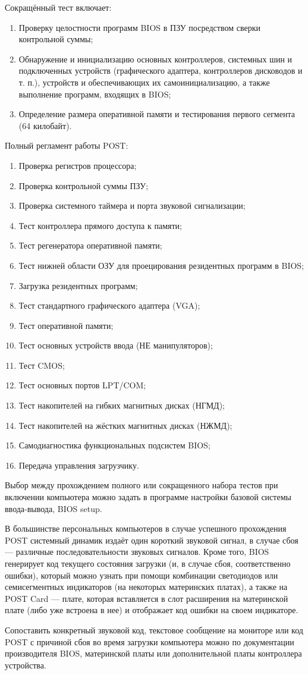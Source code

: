Сокращённый тест включает:
\begin{enumerate}
 \item Проверку целостности программ BIOS в ПЗУ посредством сверки контрольной суммы;
 \item Обнаружение и инициализацию основных контроллеров, системных шин и подключенных устройств (графического адаптера, контроллеров дисководов и т. п.), устройств и обеспечивающих их самоинициализацию, а также выполнение программ, входящих в BIOS;
 \item Определение размера оперативной памяти и тестирования первого сегмента (64 килобайт).
\end{enumerate}

Полный регламент работы POST:
\begin{enumerate}
 \item Проверка регистров процессора;
 \item Проверка контрольной суммы ПЗУ;
 \item Проверка системного таймера и порта звуковой сигнализации;
 \item Тест контроллера прямого доступа к памяти;
 \item Тест регенератора оперативной памяти;
 \item Тест нижней области ОЗУ для проецирования резидентных программ в BIOS;
 \item Загрузка резидентных программ;
 \item Тест стандартного графического адаптера (VGA);
 \item Тест оперативной памяти;
 \item Тест основных устройств ввода (НЕ манипуляторов);
 \item Тест CMOS;
 \item Тест основных портов LPT/COM;
 \item Тест накопителей на гибких магнитных дисках (НГМД);
 \item Тест накопителей на жёстких магнитных дисках (НЖМД);
 \item Самодиагностика функциональных подсистем BIOS;
 \item Передача управления загрузчику.
\end{enumerate}

Выбор между прохождением полного или сокращенного набора тестов при включении компьютера можно задать в программе настройки базовой системы ввода-вывода, BIOS setup.

В большинстве персональных компьютеров в случае успешного прохождения POST системный динамик издаёт один короткий звуковой сигнал, в случае сбоя --- различные последовательности звуковых сигналов. Кроме того, BIOS генерирует код текущего состояния загрузки (и, в случае сбоя, соответственно ошибки), который можно узнать при помощи комбинации светодиодов или семисегментных индикаторов (на некоторых материнских платах), а также на POST Card --- плате, которая вставляется в слот расширения на материнской плате (либо уже встроена в нее) и отображает код ошибки на своем индикаторе.
 
Сопоставить конкретный звуковой код, текстовое сообщение на мониторе или код POST с причиной сбоя во время загрузки компьютера можно по документации производителя BIOS, материнской платы или дополнительной платы контроллера устройства.
